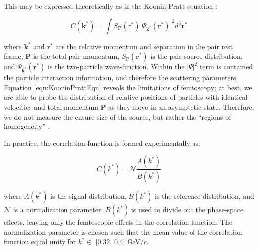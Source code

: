 \documentclass[ALICE,manyauthors]{cernphprep}
\newcommand{\kstar}{$k^{*}$\xspace}
\begin{document}
This may be expressed theoretically as in the Koonin-Pratt equation \cite{Koonin:1977fh, Pratt:1990zq}:

\begin{equation}
 C(\mathbf{k^{*}}) = \int S_{\mathbf{P}}(\mathbf{r^{*}})|\Psi_{\mathbf{k^{*}}}(\mathbf{r^{*}})|^{2}d^{3}\mathbf{r^{*}}
\label{eqn:KooninPrattEqn}
\end{equation}

where $\mathbf{k}^{*}$ and $\mathbf{r}^{*}$ are the relative momentum and separation in the pair rest frame, $\mathbf{P}$ is the total pair momentum, $S_{\mathbf{P}}(\mathbf{r^{*}})$ is the pair source distribution, and $\Psi_{\mathbf{k^{*}}}(\mathbf{r^{*}})$ is the two-particle wave-function.
Within the $|\Psi|^{2}$ term is contained the particle interaction information, and therefore the scattering parameters.
Equation \ref{eqn:KooninPrattEqn} reveals the limitations of femtoscopy; at best, we are able to probe the distribution of relative positions of particles with identical velocities and total momentum $\mathbf{P}$ as they move in an asymptotic state.  
Therefore, we do not measure the enture size of the source, but rather the ``regions of homogeneity'' \cite{Akkelin:1995gh}.

In practice, the correlation function is formed experimentally as:

\begin{equation}
  C(k^{*}) = \mathcal{N}\frac{A(k^{*})}{B(k^{*})}
\label{eqn:CfExp}
\end{equation}


where $A(k^{*})$ is the signal distribution, $B(k^{*})$ is the reference distribution, and $\mathcal{N}$ is a normalization parameter.  
$B(k^{*})$ is used to divide out the phase-space effects, leaving only the femtoscopic effects in the correlation function. 
The normalization parameter is chosen such that the mean value of the correlation function equal unity for \kstar $\in$ [0.32, 0.4] GeV/$c$.
\end{document}
